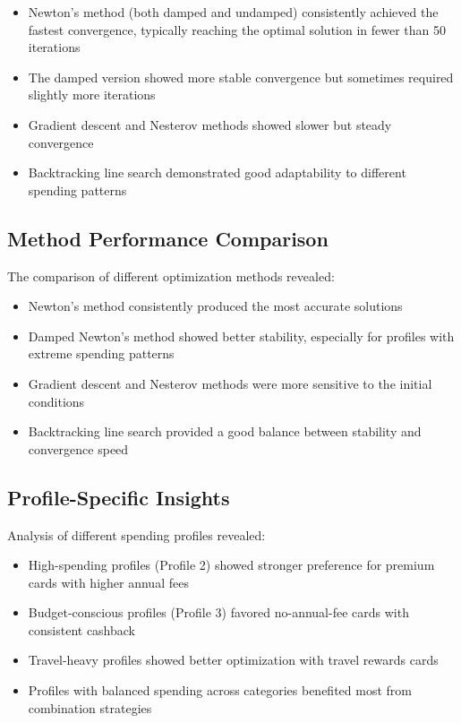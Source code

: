 \documentclass{article}
\begin{document}
\begin{itemize}
    \item Newton's method (both damped and undamped) consistently achieved the fastest convergence, typically reaching the optimal solution in fewer than 50 iterations
    \item The damped version showed more stable convergence but sometimes required slightly more iterations
    \item Gradient descent and Nesterov methods showed slower but steady convergence
    \item Backtracking line search demonstrated good adaptability to different spending patterns
\end{itemize}

\subsection{Method Performance Comparison}
The comparison of different optimization methods revealed:

\begin{itemize}
    \item Newton's method consistently produced the most accurate solutions
    \item Damped Newton's method showed better stability, especially for profiles with extreme spending patterns
    \item Gradient descent and Nesterov methods were more sensitive to the initial conditions
    \item Backtracking line search provided a good balance between stability and convergence speed
\end{itemize}

\subsection{Profile-Specific Insights}
Analysis of different spending profiles revealed:

\begin{itemize}
    \item High-spending profiles (Profile 2) showed stronger preference for premium cards with higher annual fees
    \item Budget-conscious profiles (Profile 3) favored no-annual-fee cards with consistent cashback
    \item Travel-heavy profiles showed better optimization with travel rewards cards
    \item Profiles with balanced spending across categories benefited most from combination strategies
\end{itemize}
\end{document}
